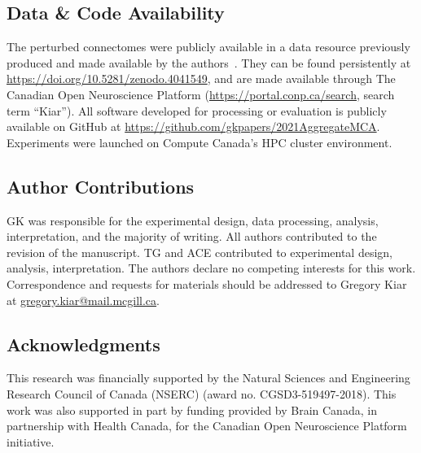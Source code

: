 \documentclass[10pt]{SelfArx} %
\begin{document}
\subsection*{Data \& Code Availability}
The perturbed connectomes were publicly available in a data resource previously produced and made available by the
authors~\cite{Kiar2020-yz}. They can be found persistently at \url{https://doi.org/10.5281/zenodo.4041549}, and are
made available through The Canadian Open Neuroscience Platform (\url{https://portal.conp.ca/search}, search term
``Kiar''). All software developed for processing or evaluation is publicly available on GitHub at
\url{https://github.com/gkpapers/2021AggregateMCA}. Experiments were launched on Compute Canada's HPC cluster
environment. 

\subsection*{Author Contributions}
GK was responsible for the experimental design, data processing, analysis, interpretation, and the majority of writing.
All authors contributed to the revision of the manuscript. TG and ACE contributed to experimental design, analysis,
interpretation. The authors declare no competing interests for this work. Correspondence and requests for materials
should be addressed to Gregory Kiar at \url{gregory.kiar@mail.mcgill.ca}.

\subsection*{Acknowledgments} 
This research was financially supported by the Natural Sciences and Engineering Research Council of Canada (NSERC)
(award no. CGSD3-519497-2018). This work was also supported in part by funding provided by Brain Canada, in partnership
with Health Canada, for the Canadian Open Neuroscience Platform initiative.



\end{document}
